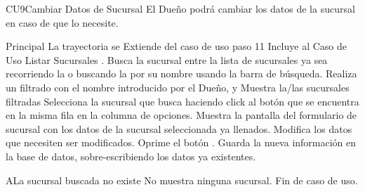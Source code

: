 \begin{UseCase}{CU9}{Cambiar Datos de Sucursal}{
		El Dueño podrá cambiar los datos de la sucursal en caso de que lo necesite.
	}
	\end{UseCase}
	\begin{UCtrayectoria}{Principal}
		\UCpaso La trayectoria se Extiende del caso de uso  paso 11
		\UCpaso Incluye al Caso de Uso Listar Sucursales .
		\UCpaso[\UCactor] Busca la sucursal entre la lista de sucursales ya sea recorriendo la o buscando la por su nombre usando la barra de búsqueda.
		\UCpaso Realiza un filtrado con el nombre introducido por el Dueño, y Muestra la/las sucursales filtradas 
		\UCpaso[\UCactor] Selecciona la sucursal que busca haciendo click al botón  que se encuentra en la misma fila en la columna de opciones.
		\UCpaso Muestra la pantalla del formulario de sucursal con los datos de la sucursal seleccionada ya llenados.
		\UCpaso [\UCactor] Modifica los datos que necesiten ser modificados.
		\UCpaso [\UCactor] Oprime el botón .
		\UCpaso Guarda la nueva información en la base de datos, sobre-escribiendo los datos ya existentes.
	\end{UCtrayectoria}

\begin{UCtrayectoriaA}{A}{La sucursal buscada no existe}
			\UCpaso No muestra ninguna sucursal.
			\UCpaso Fin de caso de uso.
		\end{UCtrayectoriaA}
		


